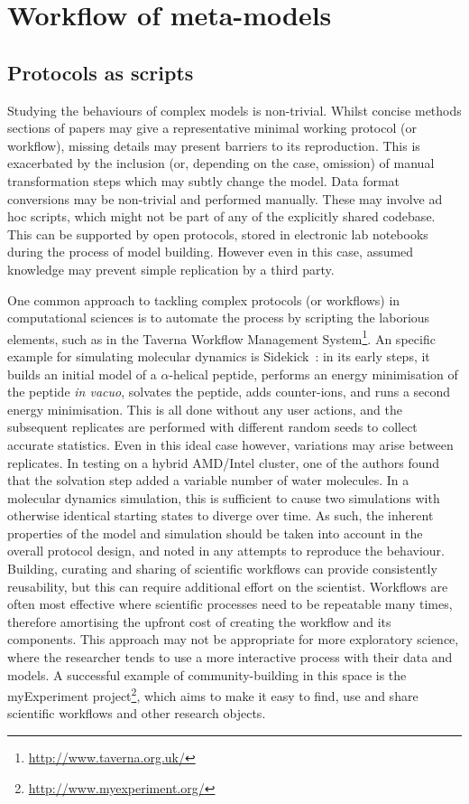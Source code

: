 \documentclass[conference]{IEEEtran}
\begin{document}
\section{Workflow of meta-models}

\subsection{Protocols as scripts}

Studying the behaviours of complex models is non-trivial. Whilst
concise methods sections of papers may give a representative minimal
working protocol (or workflow), missing details may present barriers
to its reproduction. This is exacerbated by the inclusion (or,
depending on the case, omission) of manual transformation steps which
may subtly change the model. Data format conversions may be
non-trivial and performed manually. These may involve ad hoc scripts,
which might not be part of any of the explicitly shared codebase. This
can be supported by open protocols, stored in electronic lab notebooks
during the process of model building. However even in this case,
assumed knowledge may prevent simple replication by a third party.

One common approach to tackling complex protocols (or workflows) in
computational sciences is to automate the process by scripting the
laborious elements, such as in the Taverna Workflow Management
System\footnote{\url{http://www.taverna.org.uk/}}. An specific example
for simulating molecular dynamics is Sidekick~\cite{Hall2014Sidekick}:
in its early steps, it builds an initial model of a $\alpha$-helical
peptide, performs an energy minimisation of the peptide \emph{in
vacuo}, solvates the peptide, adds counter-ions, and runs a second
energy minimisation. This is all done without any user actions, and
the subsequent replicates are performed with different random seeds to
collect accurate statistics. Even in this ideal case however,
variations may arise between replicates. In testing on a hybrid
AMD/Intel cluster, one of the authors found that the solvation step
added a variable number of water molecules. In a molecular dynamics
simulation, this is sufficient to cause two simulations with otherwise
identical starting states to diverge over time. As such, the inherent
properties of the model and simulation should be taken into account in
the overall protocol design, and noted in any attempts to reproduce
the behaviour. Building, curating and sharing of scientific workflows
can provide consistently reusability, but this can require additional
effort on the scientist.  Workflows are often most effective where
scientific processes need to be repeatable many times, therefore
amortising the upfront cost of creating the workflow and its
components. This approach may not be appropriate for more exploratory
science, where the researcher tends to use a more interactive process
with their data and models. A successful example of community-building
in this space is the myExperiment
project\footnote{\url{http://www.myexperiment.org/}}, which aims to
make it easy to find, use and share scientific workflows and other
research objects.
\end{document}
